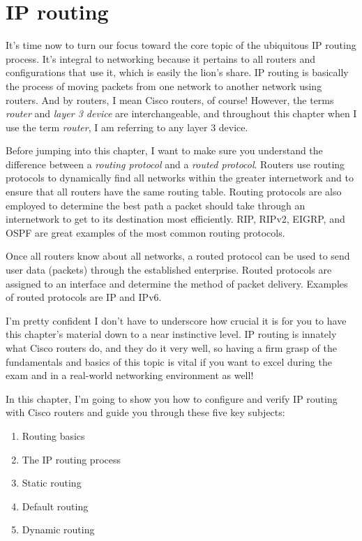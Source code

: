 \chapter{IP routing}
\label{chap:ip-routing}

It's time now to turn our focus toward the core topic of the ubiquitous IP
routing process. It's integral to networking because it pertains to all
routers and configurations that use it, which is easily the lion's
share. IP routing is basically the process of moving packets from one
network to another network using routers. And by routers, I mean Cisco
routers, of course! However, the terms \emph{router} and \emph{layer 3
device} are interchangeable, and throughout this chapter when I use the
term \emph{router}, I am referring to any layer 3 device.

Before jumping into this chapter, I want to make sure you understand the
difference between a \emph{routing protocol} and a \emph{routed
protocol}. Routers use routing protocols to dynamically find all
networks within the greater internetwork and to ensure that all routers
have the same routing table. Routing protocols are also employed to
determine the best path a packet should take through an internetwork to
get to its destination most efficiently. RIP, RIPv2, EIGRP, and OSPF are
great examples of the most common routing protocols.

Once all routers know about all networks, a routed protocol can be used
to send user data (packets) through the established enterprise. Routed
protocols are assigned to an interface and determine the method of
packet delivery. Examples of routed protocols are IP and IPv6.

I'm pretty confident I don't have to underscore how crucial it is for
you to have this chapter's material down to a near instinctive level. IP
routing is innately what Cisco routers do, and they do it very well, so
having a firm grasp of the fundamentals and basics of this topic is
vital if you want to excel during the exam and in a real-world
networking environment as well!

In this chapter, I'm going to show you how to configure and verify IP
routing with Cisco routers and guide you through these five key
subjects:

\begin{enumerate}
\tightlist
\item
  Routing basics
\item
  The IP routing process
\item
  Static routing
\item
  Default routing
\item
  Dynamic routing
\end{enumerate}

